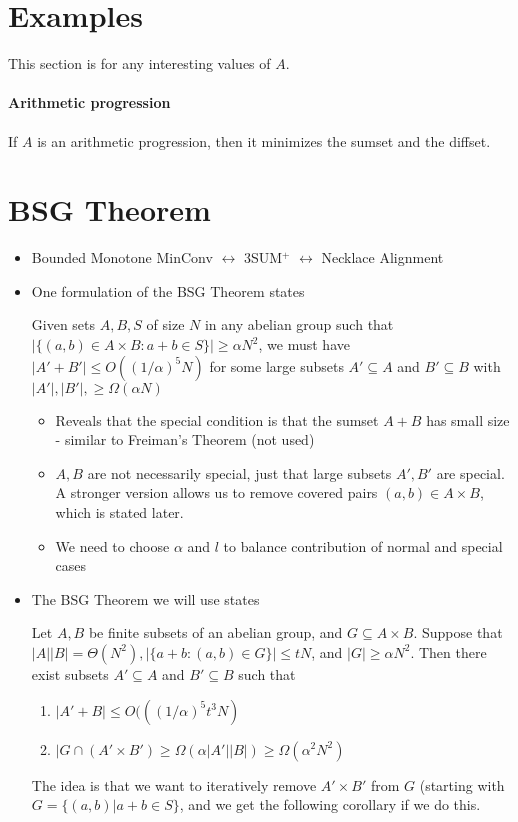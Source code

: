 \documentclass{article}
\begin{document}
\section{Examples}%
\label{sec:examples}

This section is for any interesting values of $A$.

\paragraph{Arithmetic progression} If $A$ is an arithmetic progression, then it minimizes the sumset and the diffset.

\section{BSG Theorem}
\begin{itemize}
    \item Bounded Monotone MinConv $\leftrightarrow$ 3SUM$^+$ $\leftrightarrow$ Necklace Alignment
    \item One formulation of the BSG Theorem states
    
    Given sets $A,B,S$ of size $N$ in any abelian group such that $|\{(a,b) \in A \times B : a+b \in S\}| \geq \alpha N^2$, we must have $|A'+B'| \leq O((1/\alpha)^5 N)$ for some large subsets $A' \subseteq A$ and $B' \subseteq B$ with $|A'|, |B'|, \geq \Omega(\alpha N)$
    \begin{itemize}
        \item Reveals that the special condition is that the sumset $A+B$ has small size - similar to Freiman's Theorem (not used)
        \item $A,B$ are not necessarily special, just that large subsets $A', B'$ are special. A stronger version allows us to remove covered pairs $(a,b) \in A \times B$, which is stated later.
        \item We need to choose $\alpha$ and $l$ to balance contribution of normal and special cases
    \end{itemize}
    
    \item The BSG Theorem we will use states
    
    Let $A,B$ be finite subsets of an abelian group, and $G \subseteq A \times B$. Suppose that $|A||B| = \Theta(N^2), |\{a+b: (a,b) \in G\}| \leq tN$, and $|G| \geq \alpha N^2$. Then there exist subsets $A' \subseteq A$ and $B' \subseteq B$ such that 
    \begin{enumerate}
        \item $|A' + B| \leq O(((1/\alpha)^5t^3N)$
        \item $|G \cap (A' \times B') \geq \Omega(\alpha|A'||B|) \geq \Omega(\alpha^2N^2)$
    \end{enumerate}
    The idea is that we want to iteratively remove $A' \times B'$ from $G$ (starting with $G = \{(a,b) | a+b \in S\}$, and we get the following corollary if we do this.
    

\end{itemize}
\end{document}
